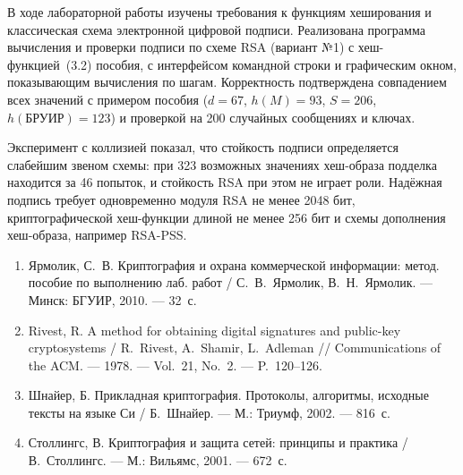 \documentclass[14pt,a4paper]{extarticle}
\begin{document}

В ходе лабораторной работы изучены требования к функциям хеширования и классическая
схема электронной цифровой подписи. Реализована программа вычисления и проверки
подписи по схеме RSA (вариант №1) с хеш-функцией~(3.2) пособия, с интерфейсом
командной строки и графическим окном, показывающим вычисления по шагам. Корректность
подтверждена совпадением всех значений с примером пособия ($d = 67$, $h(M) = 93$,
$S = 206$, $h(\text{БРУИР}) = 123$) и проверкой на 200 случайных сообщениях и ключах.

Эксперимент с коллизией показал, что стойкость подписи определяется слабейшим звеном
схемы: при 323 возможных значениях хеш-образа подделка находится за 46 попыток, и
стойкость RSA при этом не играет роли. Надёжная подпись требует одновременно модуля
RSA не менее 2048 бит, криптографической хеш-функции длиной не менее 256 бит и
схемы дополнения хеш-образа, например RSA-PSS.


\begin{enumerate}
\item Ярмолик, С.~В. Криптография и охрана коммерческой информации: метод. пособие по
выполнению лаб. работ / С.~В.~Ярмолик, В.~Н.~Ярмолик. --- Минск: БГУИР, 2010. --- 32~с.
\item Rivest, R. A method for obtaining digital signatures and public-key cryptosystems /
R.~Rivest, A.~Shamir, L.~Adleman // Communications of the ACM. --- 1978. --- Vol.~21,
No.~2. --- P.~120--126.
\item Шнайер, Б. Прикладная криптография. Протоколы, алгоритмы, исходные тексты на
языке Си / Б.~Шнайер. --- М.: Триумф, 2002. --- 816~с.
\item Столлингс, В. Криптография и защита сетей: принципы и практика /
В.~Столлингс. --- М.: Вильямс, 2001. --- 672~с.
\end{enumerate}
\end{document}
